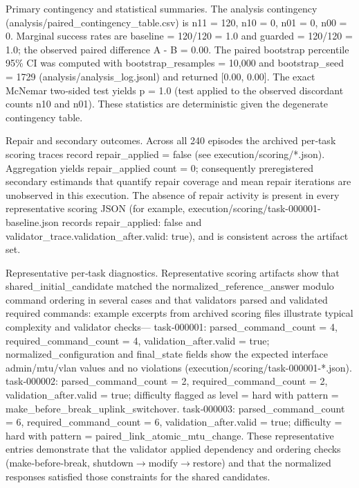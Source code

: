 \documentclass[conference]{IEEEtran}
\begin{document}
Primary contingency and statistical summaries. The analysis contingency (analysis/paired\_contingency\_table.csv) is n11 = 120, n10 = 0, n01 = 0, n00 = 0. Marginal success rates are baseline = 120/120 = 1.0 and guarded = 120/120 = 1.0; the observed paired difference A - B = 0.00. The paired bootstrap percentile 95\% CI was computed with bootstrap\_resamples = 10,000 and bootstrap\_seed = 1729 (analysis/analysis\_log.jsonl) and returned [0.00, 0.00]. The exact McNemar two‑sided test yields p = 1.0 (test applied to the observed discordant counts n10 and n01). These statistics are deterministic given the degenerate contingency table.

Repair and secondary outcomes. Across all 240 episodes the archived per‑task scoring traces record repair\_applied = false (see execution/scoring/*.json). Aggregation yields repair\_applied count = 0; consequently preregistered secondary estimands that quantify repair coverage and mean repair iterations are unobserved in this execution. The absence of repair activity is present in every representative scoring JSON (for example, execution/scoring/task-000001-baseline.json records repair\_applied: false and validator\_trace.validation\_after.valid: true), and is consistent across the artifact set.

Representative per‑task diagnostics. Representative scoring artifacts show that shared\_initial\_candidate matched the normalized\_reference\_answer modulo command ordering in several cases and that validators parsed and validated required commands: example excerpts from archived scoring files illustrate typical complexity and validator checks---
\textbullet{} task‑000001: parsed\_command\_count = 4, required\_command\_count = 4, validation\_after.valid = true; normalized\_configuration and final\_state fields show the expected interface admin/mtu/vlan values and no violations (execution/scoring/task-000001-*.json).
\textbullet{} task‑000002: parsed\_command\_count = 2, required\_command\_count = 2, validation\_after.valid = true; difficulty flagged as level = hard with pattern = make\_before\_break\_uplink\_switchover.
\textbullet{} task‑000003: parsed\_command\_count = 6, required\_command\_count = 6, validation\_after.valid = true; difficulty = hard with pattern = paired\_link\_atomic\_mtu\_change.
These representative entries demonstrate that the validator applied dependency and ordering checks (make‑before‑break, shutdown\ensuremath{\rightarrow}modify\ensuremath{\rightarrow}restore) and that the normalized responses satisfied those constraints for the shared candidates.
\end{document}
